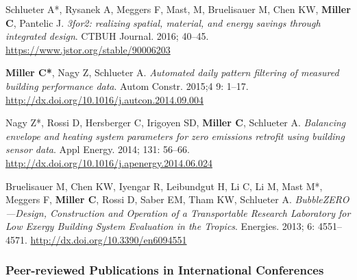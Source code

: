 \documentclass[10pt,a4paper]{article}
\begin{document}
\begin{small}
\begin{etaremune}
\item
Schlueter A*, Rysanek A, Meggers F, Mast, M, Bruelisauer M, Chen KW, \textbf{Miller C}, Pantelic J. \emph{3for2: realizing spatial, material, and energy savings through integrated design}. CTBUH Journal. 2016; 40–45. \url{https://www.jstor.org/stable/90006203}
\item
\textbf{Miller C*}, Nagy Z, Schlueter A. \emph{Automated daily pattern filtering of measured building performance data}. Autom Constr. 2015;4 9: 1–17. \url{http://dx.doi.org/10.1016/j.autcon.2014.09.004}
\item
Nagy Z*, Rossi D, Hersberger C, Irigoyen SD, \textbf{Miller C}, Schlueter A. \emph{Balancing envelope and heating system parameters for zero emissions retrofit using building sensor data}. Appl Energy. 2014; 131: 56–66. \url{http://dx.doi.org/10.1016/j.apenergy.2014.06.024}
\item
Bruelisauer M, Chen KW, Iyengar R, Leibundgut H, Li C, Li M, Mast M*, Meggers F, \textbf{Miller C}, Rossi D, Saber EM, Tham KW, Schlueter A. \emph{BubbleZERO—Design, Construction and Operation of a Transportable Research Laboratory for Low Exergy Building System Evaluation in the Tropics}. Energies. 2013; 6: 4551–4571. \url{http://dx.doi.org/10.3390/en6094551}
\end{etaremune}


\subsubsection*{Peer-reviewed Publications in International Conferences}
\begin{etaremune}


\end{etaremune}
\end{small}
\end{document}
